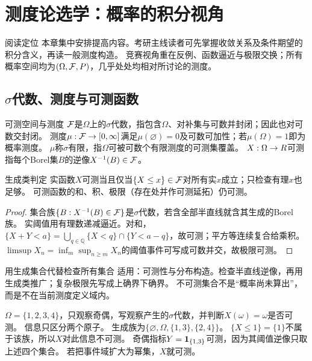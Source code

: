 \chapter{测度论选学：概率的积分视角}\label{ch:10}
\begin{measurebox}{阅读定位}
本章集中安排提高内容。考研主线读者可先掌握收敛关系及条件期望的积分含义，再读一般测度构造。
竞赛视角重在反例、函数逼近与极限交换；所有概率空间均为$(\Omega,\mathcal F,P)$，几乎处处均相对所讨论的测度。
\end{measurebox}
\section{\ensuremath{\sigma}代数、测度与可测函数}\label{sec:101}
\begin{definition}{可测空间与测度}
$\mathcal F$是$\Omega$上的$\sigma$代数，指包含$\Omega$、对补集与可数并封闭；因此也对可数交封闭。
测度$\mu:\mathcal F\to[0,\infty]$满足$\mu(\varnothing)=0$及可数可加性；若$\mu(\Omega)=1$即为概率测度。
$\mu$称$\sigma$有限，指$\Omega$可被可数个有限测度的可测集覆盖。
$X:\Omega\to R$可测指每个Borel集$B$的逆像$X^{-1}(B)\in\mathcal F$。
\end{definition}
\begin{lemma}{生成类判定}
实函数$X$可测当且仅当$\{X\le x\}\in\mathcal F$对所有实$x$成立；只检查有理$x$也足够。
可测函数的和、积、极限（存在处并作可测延拓）仍可测。
\end{lemma}
\begin{proof}
集合族$\{B:X^{-1}(B)\in\mathcal F\}$是$\sigma$代数，若含全部半直线就含其生成的Borel族。
实阈值用有理数递减逼近。对和，$\{X+Y<a\}=\bigcup_{q\in\mathbb Q}\{X<q\}\cap\{Y<a-q\}$，故可测；平方等连续复合给乘积。
$\limsup X_n=\inf_m\sup_{n\ge m}X_n$的阈值事件可写成可数并交，故极限可测。
\end{proof}
\begin{method}{用生成集合代替检查所有集合}
适用：可测性与分布构造。检查半直线逆像，再用生成类推广；复杂极限先写成上确界下确界。
不可测集合不是“概率尚未算出”，而是不在当前测度定义域内。
\end{method}
{$\Omega=\{1,2,3,4\}$，只观察奇偶，写观察产生的$\sigma$代数，并判断$X(\omega)=\omega$是否可测。}
{信息只区分两个原子。}
{生成族为$\{\varnothing,\Omega,\{1,3\},\{2,4\}\}$。
$\{X\le1\}=\{1\}$不属于该族，所以$X$对此信息不可测。
奇偶指标$Y=\mathbf1_{\{1,3\}}$可测，因为其阈值逆像只取上述四个集合。
若把事件域扩大为幂集，$X$就可测。}
